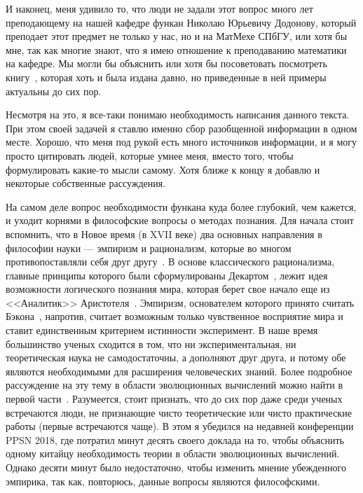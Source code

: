 \documentclass[russian]{article}
\begin{document}
И наконец, меня удивило то, что люди не задали этот вопрос много лет преподающему на нашей кафедре функан Николаю Юрьевичу Додонову, который преподает этот предмет не только у нас, но и на МатМехе СПбГУ, или хотя бы мне, так как многие знают, что я имею отношение к преподаванию математики на кафедре. Мы могли бы объяснить или хотя бы посоветовать посмотреть книгу~\cite{kollats}, которая хоть и была издана давно, но приведенные в ней примеры актуальны до сих пор.

Несмотря на это, я все-таки понимаю необходимость написания данного текста. При этом своей задачей я ставлю именно сбор разобщенной информации в одном месте. Хорошо, что меня под рукой есть много источников информации, и я могу просто цитировать людей, которые умнее меня, вместо того, чтобы формулировать какие-то мысли самому. Хотя ближе к концу я добавлю и некоторые собственные рассуждения.

На самом деле вопрос необходимости функана куда более глубокий, чем кажется, и уходит корнями в философские вопросы о методах познания. Для начала стоит вспомнить, что в Новое время (в XVII веке) два основных направления в философии науки --- эмпиризм и рационализм, которые во многом противопоставляли себя друг другу~\cite{phil}. В основе классического рационализма, главные принципы которого были сформулированы Декартом~\cite{descartes}, лежит идея возможности логического познания мира, которая берет свое начало еще из <<Аналитик>> Аристотеля~\cite{aristotel}. Эмпиризм, основателем которого принято считать Бэкона~\cite{bacon}, напротив, считает возможным только чувственное восприятие мира и ставит единственным критерием истинности эксперимент. В наше время большинство ученых сходится в том, что ни экспериментальная, ни теоретическая наука не самодостаточны, а дополняют друг друга, и потому обе являются необходимыми для расширения человеческих знаний. Более подробное рассуждение на эту тему в области эволюционных вычислений можно найти в первой части~\cite{doerr}. Разумеется, стоит признать, что до сих пор даже среди ученых встречаются люди, не признающие чисто теоретические или чисто практические работы (первые встречаются чаще). В этом я убедился на недавней конференции PPSN 2018, где потратил минут десять своего доклада на то, чтобы объяснить одному китайцу необходимость теории в области эволюционных вычислений. Однако десяти минут было недостаточно, чтобы изменить мнение убежденного эмпирика, так как, повторюсь, данные вопросы являются философскими.
\end{document}
